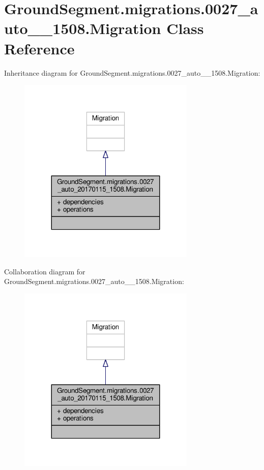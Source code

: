 \hypertarget{class_ground_segment_1_1migrations_1_10027__auto__20170115__1508_1_1_migration}{}\section{Ground\+Segment.\+migrations.0027\+\_\+auto\+\_\+\_\+1508.Migration Class Reference}
\label{class_ground_segment_1_1migrations_1_10027__auto__20170115__1508_1_1_migration}


Inheritance diagram for Ground\+Segment.\+migrations.0027\+\_\+auto\+\_\+\_\+1508.Migration\+:\nopagebreak
\begin{figure}[H]
\begin{center}
\leavevmode
\includegraphics[width=239pt]{class_ground_segment_1_1migrations_1_10027__auto__20170115__1508_1_1_migration__inherit__graph}
\end{center}
\end{figure}


Collaboration diagram for Ground\+Segment.\+migrations.0027\+\_\+auto\+\_\+\_\+1508.Migration\+:\nopagebreak
\begin{figure}[H]
\begin{center}
\leavevmode
\includegraphics[width=239pt]{class_ground_segment_1_1migrations_1_10027__auto__20170115__1508_1_1_migration__coll__graph}
\end{center}
\end{figure}
